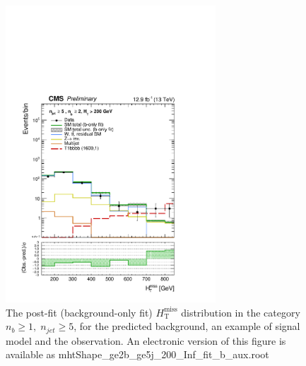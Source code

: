 \begin{figure}[tbhp]
    \caption{ 
    The post-fit (background-only fit) $H_{\mathrm{T}}^{\mathrm{miss}}$ distribution in the category $n_{b}\geq 1, \; n_{jet} \geq 5$, 
    for the predicted background, an example of signal model and the observation.
    An electronic version of this figure is available as mhtShape\_ge2b\_ge5j\_200\_Inf\_fit\_b\_aux.root
    \label{fig:mhtShape_ge2b_ge5j_fit_b} }
  \begin{center}
  \includegraphics[width=0.7\textwidth]{mhtShape_ge2b_ge5j_200_Inf_fit_b_aux}
  \end{center}
\end{figure}
